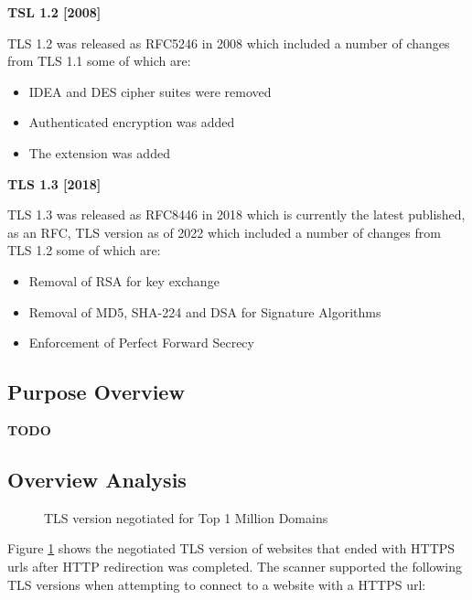 \documentclass{mscreport}
\begin{document}
\vspace{0.7cm} \noindent
\textbf{TSL 1.2 [2008]}

\noindent
TLS 1.2 was released as RFC5246 in 2008 \cite{Dierks2008-uy} which included a number of changes from TLS 1.1 some of which are:
\begin{itemize}
  \setlength\itemsep{0.1em}
  \item IDEA and DES cipher suites were removed
  \item Authenticated encryption was added
  \item The extension \texttt{} was added
\end{itemize}

\vspace{0.7cm} \noindent
\textbf{TLS 1.3 [2018]}

\noindent
TLS 1.3 was released as RFC8446 in 2018 \cite{Rescorla2018-wb} which is currently the latest published, as an RFC, TLS version as of 2022 which included a number of changes from TLS 1.2 some of which are:
\begin{itemize}
  \setlength\itemsep{0.1em}
  \item Removal of RSA for key exchange
  \item Removal of MD5, SHA-224 and DSA for Signature Algorithms
  \item Enforcement of Perfect Forward Secrecy
\end{itemize}

\subsection{Purpose Overview}

\textbf{TODO}

\subsection{Overview Analysis}

\begin{figure}[H]
	\begin{center}
		\caption{TLS version negotiated for Top 1 Million Domains}
		\label{fig:tls_negotiated}
	\end{center}
\end{figure}

\noindent
Figure \ref{fig:tls_negotiated} shows the negotiated TLS version of websites that ended with HTTPS urls after HTTP redirection was completed. The scanner supported the following TLS versions when attempting to connect to a website with a HTTPS url:
\end{document}
